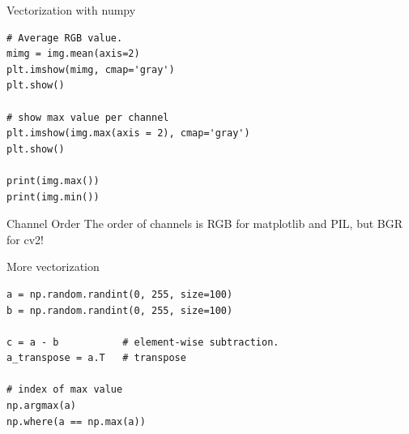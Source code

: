 \documentclass[compress%
,aspectratio=169%
]{beamer}
\begin{document}
\begin{frame}[fragile]{Vectorization with numpy}

    \begin{lstlisting}
# Average RGB value.
mimg = img.mean(axis=2)
plt.imshow(mimg, cmap='gray')
plt.show()

# show max value per channel
plt.imshow(img.max(axis = 2), cmap='gray')
plt.show()

print(img.max())
print(img.min())
    \end{lstlisting}

\begin{alertblock}{Channel Order}
The order of channels is RGB for matplotlib and PIL, but BGR for cv2!
\end{alertblock}

\end{frame}

\begin{frame}[fragile]{More vectorization}
\begin{lstlisting}
a = np.random.randint(0, 255, size=100)
b = np.random.randint(0, 255, size=100)

c = a - b           # element-wise subtraction.
a_transpose = a.T   # transpose

# index of max value
np.argmax(a)
np.where(a == np.max(a))
\end{lstlisting}

\end{frame}
\end{document}
